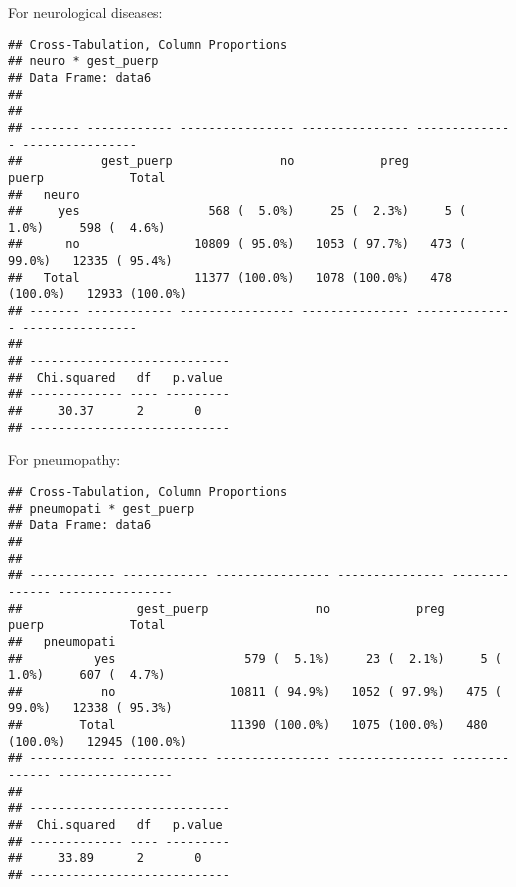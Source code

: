 \documentclass[
]{article}
\newenvironment{Shaded}{\begin{snugshade}}{\end{snugshade}}
\newcommand{\DataTypeTok}[1]{\textcolor[rgb]{0.13,0.29,0.53}{#1}}
\newcommand{\KeywordTok}[1]{\textcolor[rgb]{0.13,0.29,0.53}{\textbf{#1}}}
\newcommand{\NormalTok}[1]{#1}
\newcommand{\OperatorTok}[1]{\textcolor[rgb]{0.81,0.36,0.00}{\textbf{#1}}}
\newcommand{\OtherTok}[1]{\textcolor[rgb]{0.56,0.35,0.01}{#1}}
\newcommand{\StringTok}[1]{\textcolor[rgb]{0.31,0.60,0.02}{#1}}
\begin{document}
For neurological diseases:

\begin{Shaded}
\end{Shaded}

\begin{verbatim}
## Cross-Tabulation, Column Proportions  
## neuro * gest_puerp  
## Data Frame: data6  
## 
## 
## ------- ------------ ---------------- --------------- -------------- ----------------
##           gest_puerp               no            preg          puerp            Total
##   neuro                                                                              
##     yes                  568 (  5.0%)     25 (  2.3%)     5 (  1.0%)     598 (  4.6%)
##      no                10809 ( 95.0%)   1053 ( 97.7%)   473 ( 99.0%)   12335 ( 95.4%)
##   Total                11377 (100.0%)   1078 (100.0%)   478 (100.0%)   12933 (100.0%)
## ------- ------------ ---------------- --------------- -------------- ----------------
## 
## ----------------------------
##  Chi.squared   df   p.value 
## ------------- ---- ---------
##     30.37      2       0    
## ----------------------------
\end{verbatim}

For pneumopathy:

\begin{Shaded}
\end{Shaded}

\begin{verbatim}
## Cross-Tabulation, Column Proportions  
## pneumopati * gest_puerp  
## Data Frame: data6  
## 
## 
## ------------ ------------ ---------------- --------------- -------------- ----------------
##                gest_puerp               no            preg          puerp            Total
##   pneumopati                                                                              
##          yes                  579 (  5.1%)     23 (  2.1%)     5 (  1.0%)     607 (  4.7%)
##           no                10811 ( 94.9%)   1052 ( 97.9%)   475 ( 99.0%)   12338 ( 95.3%)
##        Total                11390 (100.0%)   1075 (100.0%)   480 (100.0%)   12945 (100.0%)
## ------------ ------------ ---------------- --------------- -------------- ----------------
## 
## ----------------------------
##  Chi.squared   df   p.value 
## ------------- ---- ---------
##     33.89      2       0    
## ----------------------------
\end{verbatim}
\end{document}
